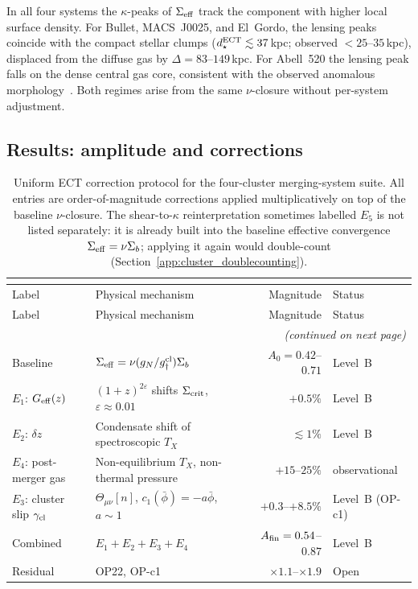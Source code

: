 \documentclass[11pt,a4paper]{article}
\numberwithin{equation}{section}
\begin{document}
In all four systems the $\kappa$-peaks of $\Sigma_{\rm eff}$ track
the component with higher local surface density.
For Bullet, MACS~J0025, and El~Gordo, the lensing peaks coincide
with the compact stellar clumps ($d_\star^{\rm ECT}\lesssim37\,$kpc;
observed $<25$--$35\,$kpc), displaced from the diffuse gas by
$\Delta=83$--$149\,$kpc.
For Abell~520 the lensing peak falls on the dense central gas core,
consistent with the observed anomalous morphology~\cite{Mahdavi2007,
Jee2012}.
Both regimes arise from the same $\nu$-closure without per-system
adjustment.

\subsection{Results: amplitude and corrections}
\label{app:cluster_amplitude}

\begin{longtable}{llrl}
\caption{Uniform ECT correction protocol for the four-cluster
merging-system suite.  All entries are order-of-magnitude
corrections applied multiplicatively on top of the baseline
$\nu$-closure.  The shear-to-$\kappa$ reinterpretation sometimes
labelled $E_5$ is not listed separately: it is already built into
the baseline effective convergence $\Sigma_{\rm eff}=\nu\Sigma_b$;
applying it again would double-count
(Section~\ref{app:cluster_doublecounting}).} \\
\label{tab:cluster_corrections} \\[-6pt]
\toprule

Label & Physical mechanism & Magnitude & Status \\
\midrule
\endfirsthead
\toprule

Label & Physical mechanism & Magnitude & Status \\
\midrule
\endhead
\midrule\multicolumn{4}{r}{\small\textit{(continued on next page)}}\\
\endfoot
\bottomrule
\endlastfoot
Baseline
  & $\Sigma_{\rm eff}=\nu(g_N/g_\dagger^{\rm cl})\Sigma_b$
  & $A_0=0.42$--$0.71$ & Level~B \\
$E_1$: $G_{\rm eff}(z)$
  & $(1{+}z)^{2\varepsilon}$ shifts $\Sigma_{\rm crit}$,
    $\varepsilon\approx0.01$
  & $+0.5\%$ & Level~B \\
$E_2$: $\delta z$
  & Condensate shift of spectroscopic $T_X$
  & $\lesssim1\%$ & Level~B \\
$E_4$: post-merger gas
  & Non-equilibrium $T_X$, non-thermal pressure
  & $+15$--$25\%$ & observational \\
$E_3$: cluster slip $\gamma_{\rm cl}$
  & $\Theta_{\mu\nu}[n]$, $c_1(\bar\phi)=-a\bar\phi$, $a\sim1$
  & $+0.3$--$+8.5\%$ & Level~B (OP-c1) \\
\midrule
Combined
  & $E_1{+}E_2{+}E_3{+}E_4$
  & $A_{\rm fin}=0.54$--$0.87$ & Level~B \\
Residual
  & OP22, OP-c1
  & $\times1.1$--$\times1.9$ & Open \\

\end{longtable}
\end{document}
